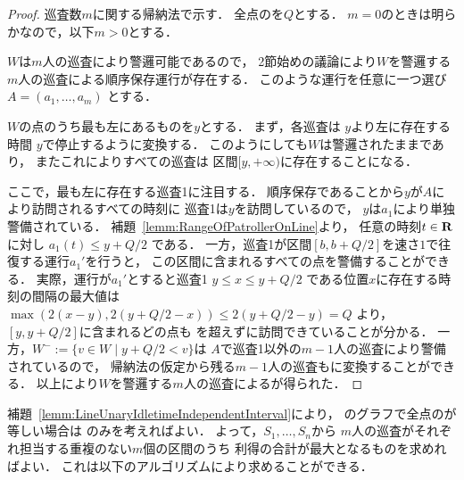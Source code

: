 \begin{proof}
  \newcommand{\leftmostpoint}{y}  %
  \newcommand{\leftmostpatroller}{巡査1}

  巡査数$m$に関する帰納法で示す．
  全点の{\maxIdletime}を$Q$とする．
  $m = 0$のときは明らかなので，以下$m > 0$とする．

  $W$は$m$人の巡査により警邏可能であるので，
  2節始めの議論により$W$を警邏する$m$人の巡査による順序保存運行が存在する．
  このような運行を任意に一つ選び
  $A = (a_1, \ldots, a_m)$
  とする．

  $W$の点のうち最も左にあるものを$\leftmostpoint$とする．
  まず，各巡査は
  $\leftmostpoint$より左に存在する時間
  $\leftmostpoint$で停止するように変換する．
  このようにしても$W$は警邏されたままであり，
  またこれによりすべての巡査は
  区間$[\leftmostpoint, +\infty)$に存在することになる．

  ここで，最も左に存在する{\leftmostpatroller}に注目する．
  順序保存であることから$\leftmostpoint$が$A$により訪問されるすべての時刻に
  {\leftmostpatroller}は$\leftmostpoint$を訪問しているので，
  $\leftmostpoint$は$a_1$により単独警備されている．
  補題~\ref{lemm:RangeOfPatrollerOnLine}より，
  任意の時刻$t \in \mathbf R$に対し
  $a_1(t) \leq \leftmostpoint + Q/2$
  である．
  一方，{\leftmostpatroller}が区間$[b, b + Q/2]$を速さ$1$で往復する運行$a_1'$を行うと，
  この区間に含まれるすべての点を警備することができる．
  実際，運行が$a_1'$とすると{\leftmostpatroller}
  $\leftmostpoint \leq x \leq \leftmostpoint + Q/2$
  である位置$x$に存在する時刻の間隔の最大値は
  $ \max( 2(x - \leftmostpoint), 2(\leftmostpoint + Q/2 - x) )
    \leq 2(\leftmostpoint + Q/2 - \leftmostpoint) = Q $
  より，$[\leftmostpoint, \leftmostpoint + Q/2]$に含まれるどの点も
  {\maxIdletime}を超えずに訪問できていることが分かる．
  一方，$W^- := \{ v \in W \mid \leftmostpoint + Q/2 < v \}$は
  $A$で{\leftmostpatroller}以外の$m - 1$人の巡査により警備されているので，
  帰納法の仮定から残る$m - 1$人の巡査も{\indSectOperation}に変換することができる．
  以上により$W$を警邏する$m$人の巡査による{\indSectOperation}が得られた．
\end{proof}


補題~\ref{lemm:LineUnaryIdletimeIndependentInterval}により，
{\graphLine}のグラフで全点の{\maxIdletime}が等しい場合は
{\indSectOperation}のみを考えればよい．
よって，$S_1, \ldots, S_n$から
$m$人の巡査がそれぞれ担当する重複のない$m$個の区間のうち
利得の合計が最大となるものを求めればよい．
これは以下のアルゴリズムにより求めることができる．

